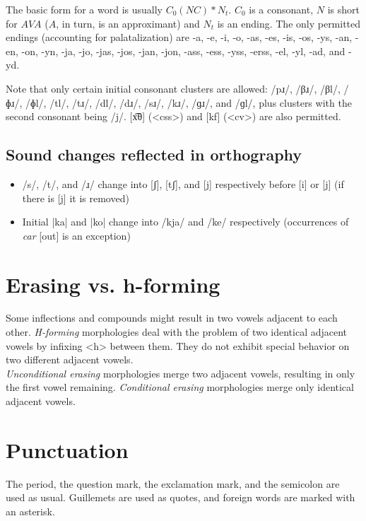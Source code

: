 \documentclass{book}
\begin{document}
The basic form for a word is usually $C_0(NC)*N_t$. $C_0$ is a consonant, $N$ is short for $AVA$ ($A$, in turn, is an approximant) and $N_t$ is an ending. The only permitted endings (accounting for palatalization) are -a, -e, -i, -o, -as, -es, -is, -os, -ys, -an, -en, -on, -yn, -ja, -jo, -jas, -jos, -jan, -jon, -ass, -ess, -yss, -erss, -el, -yl, -ad, and -yd.

Note that only certain initial consonant clusters are allowed: /pɹ/, /βɹ/, /βl/, /ɸɹ/, /ɸl/, /tl/, /tɹ/, /dl/, /dɹ/, /sɹ/, /kɹ/, /ɡɹ/, and /ɡl/, plus clusters with the second consonant being /j/. [x͡θ] (<css>) and [kf] (<cv>) are also permitted.

\subsection{Sound changes reflected in orthography}

\begin{itemize}
  \item /s/, /t/, and /ɹ/ change into [ʃ], [tʃ], and [j] respectively before [i] or [j] (if there is [j] it is removed)
  \item Initial |ka| and |ko| change into /kja/ and /ke/ respectively (occurrences of \emph{car} [out] is an exception)
\end{itemize}

\section{Erasing vs. h-forming}

Some inflections and compounds might result in two vowels adjacent to each other. \emph{H-forming} morphologies deal with the problem of two identical adjacent vowels by infixing <h> between them. They do not exhibit special behavior on two different adjacent vowels. \\
\emph{Unconditional erasing} morphologies merge two adjacent vowels, resulting in only the first vowel remaining. \emph{Conditional erasing} morphologies merge only identical adjacent vowels.

\section{Punctuation}

The period, the question mark, the exclamation mark, and the semicolon are used as usual. Guillemets are used as quotes, and foreign words are marked with an asterisk.
\end{document}

